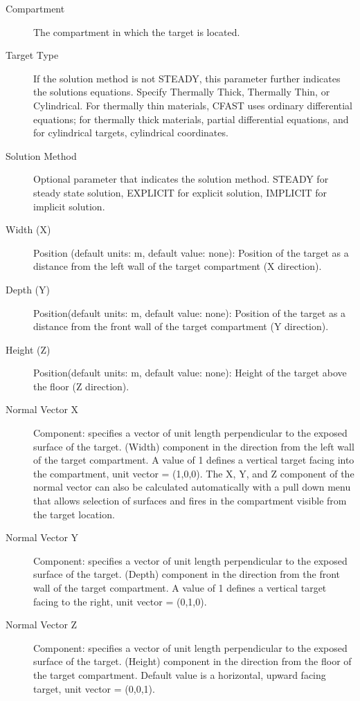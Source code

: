 \begin{description}
\item[Compartment] The compartment in which the target is located.

\item[Target Type] If the solution method is not STEADY, this parameter further indicates the solutions equations.  Specify Thermally Thick, Thermally Thin, or Cylindrical.  For thermally thin materials, CFAST uses ordinary differential equations; for thermally thick materials, partial differential equations, and for cylindrical targets, cylindrical coordinates.

\item[Solution Method] Optional parameter that indicates the solution method. STEADY for steady state solution, EXPLICIT for explicit solution, IMPLICIT for implicit solution.

\item[Width (X)] Position (default units: m, default value: none): Position of the target as a distance from the left wall of the target compartment (X direction).

\item[Depth (Y)] Position(default units: m, default value: none): Position of the target as a distance from the front wall of the target compartment (Y direction).

\item[Height (Z)] Position(default units: m, default value: none): Height of the target above the floor (Z direction).

\item[Normal Vector X] Component: specifies a vector of unit length perpendicular to the exposed surface of the target. (Width) component in the direction from the left wall of the target compartment. A value of 1 defines a vertical target facing into the compartment, unit vector = (1,0,0). The X, Y, and Z component of the normal vector can also be calculated automatically with a pull down menu that allows selection of surfaces and fires in the compartment visible from the target location.

\item[Normal Vector Y] Component: specifies a vector of unit length perpendicular to the exposed surface of the target. (Depth) component in the direction from the front wall of the target compartment. A value of 1 defines a vertical target facing to the right, unit vector = (0,1,0).

\item[Normal Vector Z] Component: specifies a vector of unit length perpendicular to the exposed surface of the target. (Height) component in the direction from the floor of the target compartment. Default value is a horizontal, upward facing target, unit vector = (0,0,1).


\end{description}
